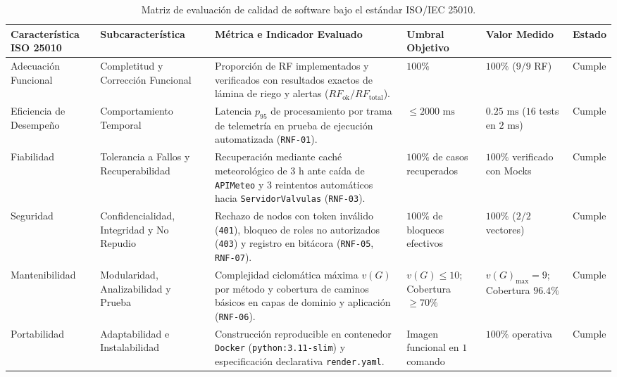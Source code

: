 \documentclass[12pt,letterpaper]{report}
\begin{document}
\begin{table}[H]
    \centering
    \footnotesize
    \renewcommand{\arraystretch}{1.3}
    \begin{tabularx}{\linewidth}{|L{2.6cm}|L{2.5cm}|Y|L{2.0cm}|L{2.0cm}|C{1.4cm}|}
        \hline
        \textbf{Característica ISO 25010} & \textbf{Subcaracterística} & \textbf{Métrica e Indicador Evaluado} & \textbf{Umbral Objetivo} & \textbf{Valor Medido} & \textbf{Estado} \\
        \hline
        Adecuación Funcional & Completitud y Corrección Funcional & Proporción de RF implementados y verificados con resultados exactos de lámina de riego y alertas ($RF_{\text{ok}} / RF_{\text{total}}$). & $100\%$ & $100\%$ ($9/9$ RF) & Cumple \\
        \hline
        Eficiencia de Desempeño & Comportamiento Temporal & Latencia $p_{95}$ de procesamiento por trama de telemetría en prueba de ejecución automatizada (\texttt{RNF-01}). & $\le 2000\text{ ms}$ & $0.25\text{ ms}$ ($16$ tests en $2\text{ ms}$) & Cumple \\
        \hline
        Fiabilidad & Tolerancia a Fallos y Recuperabilidad & Recuperación mediante caché meteorológico de $3\text{ h}$ ante caída de \texttt{APIMeteo} y $3$ reintentos automáticos hacia \texttt{ServidorValvulas} (\texttt{RNF-03}). & $100\%$ de casos recuperados & $100\%$ verificado con Mocks & Cumple \\
        \hline
        Seguridad & Confidencialidad, Integridad y No Repudio & Rechazo de nodos con token inválido (\texttt{401}), bloqueo de roles no autorizados (\texttt{403}) y registro en bitácora (\texttt{RNF-05}, \texttt{RNF-07}). & $100\%$ de bloqueos efectivos & $100\%$ ($2/2$ vectores) & Cumple \\
        \hline
        Mantenibilidad & Modularidad, Analizabilidad y Prueba & Complejidad ciclomática máxima $v(G)$ por método y cobertura de caminos básicos en capas de dominio y aplicación (\texttt{RNF-06}). & $v(G) \le 10$; Cobertura $\ge 70\%$ & $v(G)_{\max} = 9$; Cobertura $96.4\%$ & Cumple \\
        \hline
        Portabilidad & Adaptabilidad e Instalabilidad & Construcción reproducible en contenedor \texttt{Docker} (\texttt{python:3.11-slim}) y especificación declarativa \texttt{render.yaml}. & Imagen funcional en $1$ comando & $100\%$ operativa & Cumple \\
        \hline
    \end{tabularx}
    \caption{Matriz de evaluación de calidad de software bajo el estándar ISO/IEC 25010.}
    \label{tab:iso25010}
\end{table}
\end{document}
